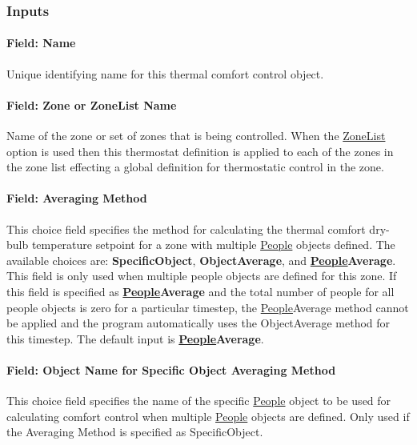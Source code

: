 \subsubsection{Inputs}\label{inputs-9-025}

\paragraph{Field: Name}\label{field-name-7-024}

Unique identifying name for this thermal comfort control object.

\paragraph{Field: Zone or ZoneList Name}\label{field-zone-or-zonelist-name-2-000}

Name of the zone or set of zones that is being controlled. When the \hyperref[zonelist]{ZoneList} option is used then this thermostat definition is applied to each of the zones in the zone list effecting a global definition for thermostatic control in the zone.

\paragraph{Field: Averaging Method}\label{field-averaging-method}

This choice field specifies the method for calculating the thermal comfort dry-bulb temperature setpoint for a zone with multiple \hyperref[people]{People} objects defined. The available choices are: \textbf{SpecificObject}, \textbf{ObjectAverage}, and \textbf{\hyperref[people]{People}Average}. This field is only used when multiple people objects are defined for this zone. If this field is specified as \textbf{\hyperref[people]{People}Average} and the total number of people for all people objects is zero for a particular timestep, the \hyperref[people]{People}Average method cannot be applied and the program automatically uses the ObjectAverage method for this timestep. The default input is \textbf{\hyperref[people]{People}Average}.

\paragraph{Field: Object Name for Specific Object Averaging Method}\label{field-object-name-for-specific-object-averaging-method}

This choice field specifies the name of the specific \hyperref[people]{People} object to be used for calculating comfort control when multiple \hyperref[people]{People} objects are defined. Only used if the Averaging Method is specified as SpecificObject.

